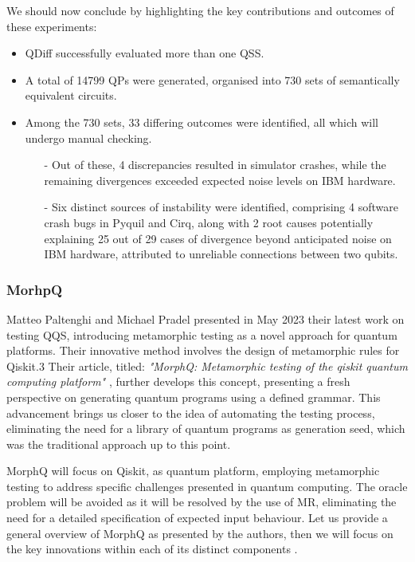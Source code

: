 \begin{itemize}
    We should now conclude by highlighting the key contributions and outcomes of these experiments:

\begin{itemize}
    \item QDiff successfully evaluated more than one QSS.
    \item A total of 14799 QPs were generated, organised into 730 sets of semantically equivalent circuits.
    \item Among the 730 sets, 33 differing outcomes were identified, all which will undergo manual checking.
    \begin{itemize}
        \item[-] Out of these, 4 discrepancies resulted in simulator crashes, while the remaining divergences exceeded expected noise levels on IBM hardware.
        \item[-] Six distinct sources of instability were identified, comprising 4 software crash bugs in Pyquil and Cirq, along with 2 root causes potentially explaining 25 out of 29 cases of divergence beyond anticipated noise on IBM hardware, attributed to unreliable connections between two qubits.
    \end{itemize}
    
\end{itemize}

\subsubsection{MorhpQ}
\label{Ch2.3.1:MorphQ}
Matteo Paltenghi and Michael Pradel presented in May 2023 their latest work on testing QQS, introducing metamorphic testing as a novel approach for quantum platforms. Their innovative method involves the design of metamorphic rules for Qiskit.3 Their article, titled: \textit{"MorphQ: Metamorphic testing of the qiskit quantum computing platform"} \cite{paltenghi2023morphq}, further develops this concept, presenting a fresh perspective on generating quantum programs using a defined grammar. This advancement brings us closer to the idea of automating the testing process, eliminating the need for a library of quantum programs as generation seed, which was the traditional approach up to this point.\newline

MorphQ will focus on Qiskit, as quantum platform, employing metamorphic testing to address specific challenges presented in quantum computing. The oracle problem will be avoided as it will be resolved by the use of MR, eliminating the need for a detailed specification of expected input behaviour. Let us provide a general overview of MorphQ as presented by the authors, then we will focus on the key innovations within each of its distinct components .


\end{itemize}
